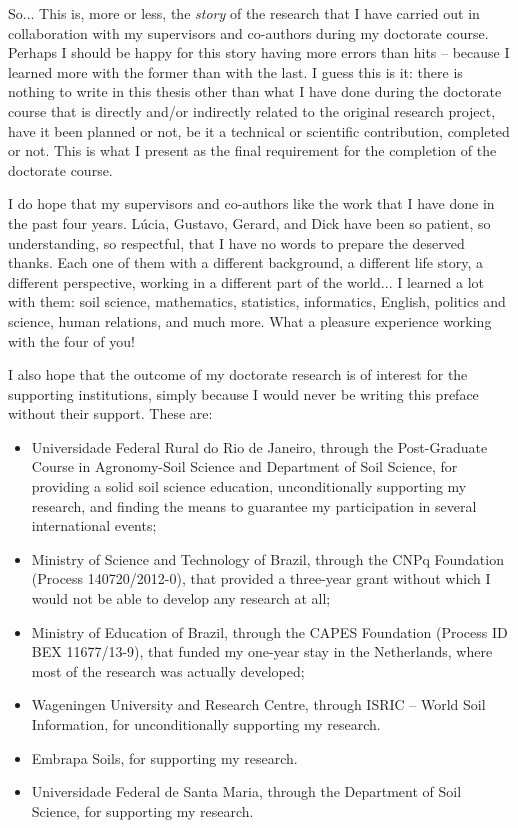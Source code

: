 So... This is, more or less, the \emph{story} of the research that I have carried out in collaboration with my 
supervisors and co-authors during my doctorate course. Perhaps I should be happy for this story having more 
errors than hits -- because I learned more with the former than with the last. I guess this is it: there is 
nothing to write in this thesis other than what I have done during the doctorate course that is directly and/or 
indirectly related to the original research project, have it been planned or not, be it a technical or 
scientific contribution, completed or not. This is what I present as the final requirement for the completion 
of the doctorate course.

I do hope that my supervisors and co-authors like the work that I have done in the past four years. Lúcia, 
Gustavo, Gerard, and Dick have been so patient, so understanding, so respectful, that I have no words to 
prepare the deserved thanks. Each one of them with a different background, a different life story, a different 
perspective, working in a different part of the world... I learned a lot with them: soil science, mathematics, 
statistics, informatics, English, politics and science, human relations, and much more. What a pleasure 
experience working with the four of you!

I also hope that the outcome of my doctorate research is of interest for the supporting institutions, simply 
because I would never be writing this preface without their support. These are:

\begin{itemize}
 \item Universidade Federal Rural do Rio de Janeiro, through the Post-Graduate Course in Agronomy-Soil Science
 and Department of Soil Science, for providing a solid soil science education, unconditionally supporting my 
 research, and finding the means to guarantee my participation in several international events;
 
 \item Ministry of Science and Technology of Brazil, through the CNPq Foundation (Process 140720/2012-0), that
 provided a three-year grant without which I would not be able to develop any research at all;
 
 \item Ministry of Education of Brazil, through the CAPES Foundation (Process ID BEX 11677/13-9), that funded
 my one-year stay in the Netherlands, where most of the research was actually developed;
 
 \item Wageningen University and Research Centre, through ISRIC -- World Soil Information, for unconditionally
 supporting my research.
 
 \item Embrapa Soils, for supporting my research.
 
 \item Universidade Federal de Santa Maria, through the Department of Soil Science, for supporting my research.
\end{itemize}

